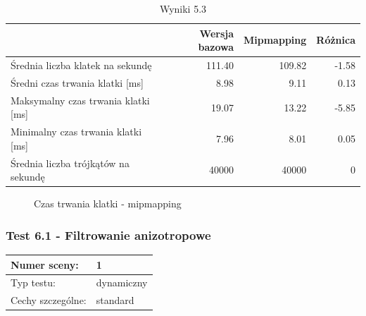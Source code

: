 \documentclass[a4paper,twoside,12pt]{book}
\begin{document}
\vbox{}

\begin{table}[H]
    \centering
    \caption{Wyniki 5.3}
    \label{tab:mip_test3}
    \begin{tabular}{|l||r|r|r|}
        \hline
        & Wersja bazowa & Mipmapping & Różnica \\
        \hline
        Średnia liczba klatek na sekundę & 111.40 & 109.82 & -1.58 \\
        \hline
        Średni czas trwania klatki [ms] & 8.98 & 9.11 & 0.13 \\
        \hline
        Maksymalny czas trwania klatki [ms] & 19.07 & 13.22 & -5.85 \\
        \hline
        Minimalny czas trwania klatki [ms] & 7.96 & 8.01 & 0.05 \\
        \hline
        Średnia liczba trójkątów na sekundę & 40000 & 40000 & 0 \\
        \hline
    \end{tabular}
\end{table}

\vbox{}

\begin{figure}[H]
\centering
{}

\caption{Czas trwania klatki - mipmapping}
\label{fig:dynamic_plot_mip3_met}
\end{figure}

\vbox{}

\subsubsection{Test 6.1 - Filtrowanie anizotropowe}
\begin{tabular}{|l||l|}
\hline
Numer sceny: & 1 \\
\hline
Typ testu: & dynamiczny \\
\hline
Cechy szczególne: & standard \\
\hline
\end{tabular}\\
\end{document}

